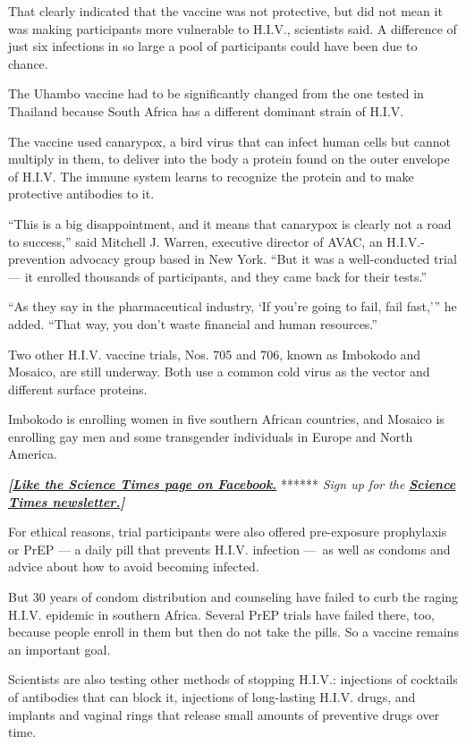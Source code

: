 That clearly indicated that the vaccine was not protective, but did not
mean it was making participants more vulnerable to H.I.V., scientists
said. A difference of just six infections in so large a pool of
participants could have been due to chance.

The Uhambo vaccine had to be significantly changed from the one tested
in Thailand because South Africa has a different dominant strain of
H.I.V.

The vaccine used canarypox, a bird virus that can infect human cells but
cannot multiply in them, to deliver into the body a protein found on the
outer envelope of H.I.V. The immune system learns to recognize the
protein and to make protective antibodies to it.

``This is a big disappointment, and it means that canarypox is clearly
not a road to success,'' said Mitchell J. Warren, executive director of
AVAC, an H.I.V.-prevention advocacy group based in New York. ``But it
was a well-conducted trial --- it enrolled thousands of participants,
and they came back for their tests.''

``As they say in the pharmaceutical industry, `If you're going to fail,
fail fast,''' he added. ``That way, you don't waste financial and human
resources.''

Two other H.I.V. vaccine trials, Nos. 705 and 706, known as Imbokodo and
Mosaico, are still underway. Both use a common cold virus as the vector
and different surface proteins.

Imbokodo is enrolling women in five southern African countries, and
Mosaico is enrolling gay men and some transgender individuals in Europe
and North America.

\textbf{\emph{{[}}\href{http://on.fb.me/1paTQ1h}{\emph{Like the Science
Times page on Facebook.}}} ****** \emph{\textbar{} Sign up for the}
\textbf{\href{http://nyti.ms/1MbHaRU}{\emph{Science Times
newsletter.}}\emph{{]}}}

For ethical reasons, trial participants were also offered pre-exposure
prophylaxis or PrEP --- a daily pill that prevents H.I.V. infection
---~as well as condoms and advice about how to avoid becoming infected.

But 30 years of condom distribution and counseling have failed to curb
the raging H.I.V. epidemic in southern Africa. Several PrEP trials have
failed there, too, because people enroll in them but then do not take
the pills. So a vaccine remains an important goal.

Scientists are also testing other methods of stopping H.I.V.: injections
of cocktails of antibodies that can block it, injections of long-lasting
H.I.V. drugs, and implants and vaginal rings that release small amounts
of preventive drugs over time.

